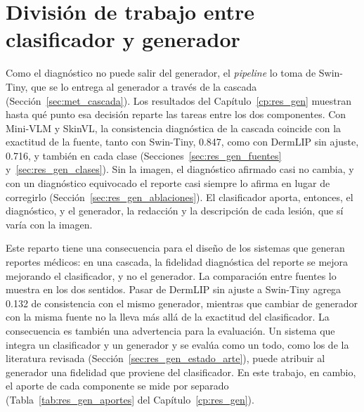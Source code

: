 \section{División de trabajo entre clasificador y generador}
\label{sec:disc_division}

Como el diagnóstico no puede salir del generador, el \emph{pipeline} lo toma de Swin-Tiny, que se lo entrega al
generador a través de la cascada (Sección~\ref{sec:met_cascada}). Los resultados del Capítulo~\ref{cp:res_gen}
muestran hasta qué punto esa decisión reparte las tareas entre los dos componentes. Con Mini-VLM y SkinVL,
la consistencia diagnóstica de la cascada coincide con la exactitud de la fuente, tanto con Swin-Tiny, 0.847, como con
DermLIP sin ajuste, 0.716, y también en cada clase (Secciones~\ref{sec:res_gen_fuentes} y~\ref{sec:res_gen_clases}).
Sin la imagen, el diagnóstico afirmado casi no cambia, y con un diagnóstico equivocado el reporte casi siempre lo afirma
en lugar de corregirlo (Sección~\ref{sec:res_gen_ablaciones}). El clasificador aporta, entonces, el diagnóstico, y el
generador, la redacción y la descripción de cada lesión, que sí varía con la imagen.

Este reparto tiene una consecuencia para el diseño de los sistemas que generan reportes médicos: en una cascada, la
fidelidad diagnóstica del reporte se mejora mejorando el clasificador, y no el generador. La comparación entre fuentes
lo muestra en los dos sentidos. Pasar de DermLIP sin ajuste a Swin-Tiny agrega 0.132 de consistencia con el mismo
generador, mientras que cambiar de generador con la misma fuente no la lleva más allá de la exactitud del
clasificador. La consecuencia es también una advertencia para la evaluación. Un sistema que integra un clasificador y
un generador y se evalúa como un todo, como los de la literatura revisada (Sección~\ref{sec:res_gen_estado_arte}),
puede atribuir al generador una fidelidad que proviene del clasificador. En este trabajo, en cambio, el aporte de cada
componente se mide por separado (Tabla~\ref{tab:res_gen_aportes} del Capítulo~\ref{cp:res_gen}).

